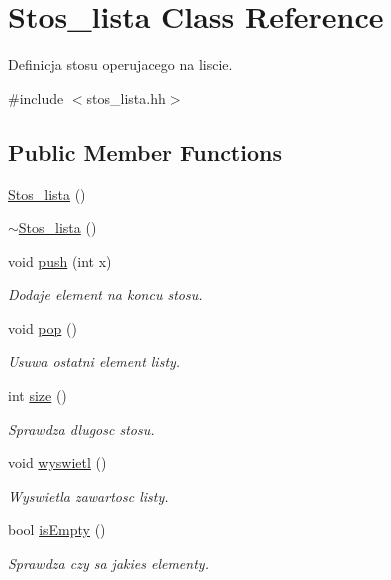 \hypertarget{class_stos__lista}{\section{\-Stos\-\_\-lista \-Class \-Reference}
\label{class_stos__lista}
}


\-Definicja stosu operujacego na liscie.  




{\ttfamily \#include $<$stos\-\_\-lista.\-hh$>$}

\subsection*{\-Public \-Member \-Functions}
\begin{DoxyCompactItemize}
\item 
\hyperlink{class_stos__lista_ac7f453eea7c8f563d84068002c6c3d6d}{\-Stos\-\_\-lista} ()
\item 
\hyperlink{class_stos__lista_a2ea239a1b5c70eec5b5ae7fc770bf15a}{$\sim$\-Stos\-\_\-lista} ()
\item 
void \hyperlink{class_stos__lista_a9dba4ca01ca80276073f38a4877590de}{push} (int x)
\begin{DoxyCompactList}\small\item\em \-Dodaje element na koncu stosu. \end{DoxyCompactList}\item 
void \hyperlink{class_stos__lista_a9cc9de09ad4dbae53f9138fbf2876874}{pop} ()
\begin{DoxyCompactList}\small\item\em \-Usuwa ostatni element listy. \end{DoxyCompactList}\item 
int \hyperlink{class_stos__lista_a4f85e132498b0ab5d95df699c2b8bc3e}{size} ()
\begin{DoxyCompactList}\small\item\em \-Sprawdza dlugosc stosu. \end{DoxyCompactList}\item 
void \hyperlink{class_stos__lista_a10024f360134055982f6b5876a3ff72e}{wyswietl} ()
\begin{DoxyCompactList}\small\item\em \-Wyswietla zawartosc listy. \end{DoxyCompactList}\item 
bool \hyperlink{class_stos__lista_a83628f66706afb6159c7ec6b7dd5c4bc}{is\-Empty} ()
\begin{DoxyCompactList}\small\item\em \-Sprawdza czy sa jakies elementy. \end{DoxyCompactList}\end{DoxyCompactItemize}


